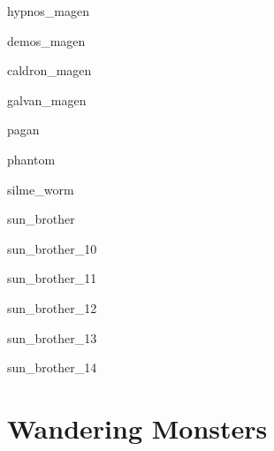 \documentclass[a4paper,serif]{module}
\begin{document}
\begin{newmonster}{hypnos_magen}\end{newmonster}
\begin{newmonster}{demos_magen}\end{newmonster}
\begin{newmonster}{caldron_magen}\end{newmonster}
\begin{newmonster}{galvan_magen}\end{newmonster}
\begin{newmonster}{pagan}\end{newmonster}
\begin{newmonster}{phantom}\end{newmonster}
\begin{newmonster}{silme_worm}\end{newmonster}
\begin{newmonster}{sun_brother}\end{newmonster}
\begin{newmonster}{sun_brother_10}\end{newmonster}
\begin{newmonster}{sun_brother_11}\end{newmonster}
\begin{newmonster}{sun_brother_12}\end{newmonster}
\begin{newmonster}{sun_brother_13}\end{newmonster}
\begin{newmonster}{sun_brother_14}\end{newmonster}

\onecolumn

\part{Wandering Monsters}
\end{document}
